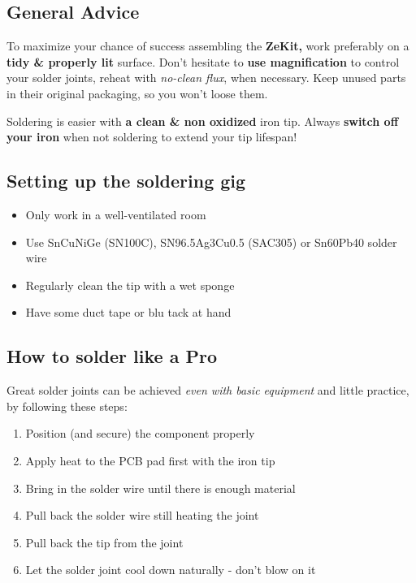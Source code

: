 \documentclass{scrartcl}
\begin{document}
\subsection{General Advice}

To maximize your chance of success assembling the \textbf{ZeKit,} work preferably on a \textbf{tidy \& properly lit} surface.
Don't hesitate to \textbf{use magnification} to control your solder joints, reheat with \emph{no-clean flux}, when necessary.
Keep unused parts in their original packaging, so you won't loose them.

Soldering is easier with \textbf{a clean \& non oxidized} iron tip. Always \textbf{switch off your iron} when not soldering to extend your tip lifespan!

\subsection{Setting up the soldering gig}

\begin{itemize}
    \item Only work in a well-ventilated room
    \item Use SnCuNiGe (SN100C), SN96.5Ag3Cu0.5 (SAC305) or Sn60Pb40 solder wire
    \item Regularly clean the tip with a wet sponge
    \item Have some duct tape or blu tack at hand
\end{itemize}

\subsection{How to solder like a Pro}

Great solder joints can be achieved \emph{even with basic equipment} and little practice,\\
by following these steps:

\begin{enumerate}
    \item Position (and secure) the component properly
    \item Apply heat to the PCB pad first with the iron tip
    \item Bring in the solder wire until there is enough material
    \item Pull back the solder wire still heating the joint
    \item Pull back the tip from the joint
    \item Let the solder joint cool down naturally - don't blow on it
\end{enumerate}
\end{document}
